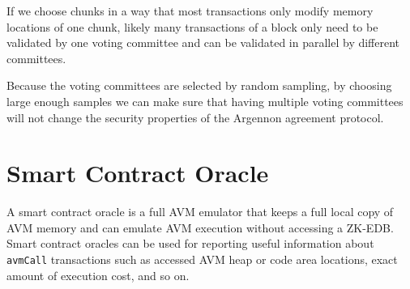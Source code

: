 \documentclass[11pt, a4paper]{report}
\begin{document}
    If we choose chunks in a way that most transactions only modify memory locations of one chunk,
    likely many transactions of a block only need to be validated by one voting committee and can be validated in
    parallel by different committees.

    Because the voting committees are selected by random sampling, by choosing large enough samples we can make sure
    that having multiple voting committees will not change the security properties of the Argennon agreement protocol.


    \section{Smart Contract Oracle}\label{sec:smart-contract-oracle}

    A smart contract oracle is a full AVM emulator that keeps a full local copy of AVM memory and can emulate AVM
    execution without accessing a ZK-EDB. Smart contract oracles can be used for reporting useful information about
    \texttt{avmCall} transactions such as accessed AVM heap or code area locations, exact amount of execution cost,
    and so on.
\end{document}
